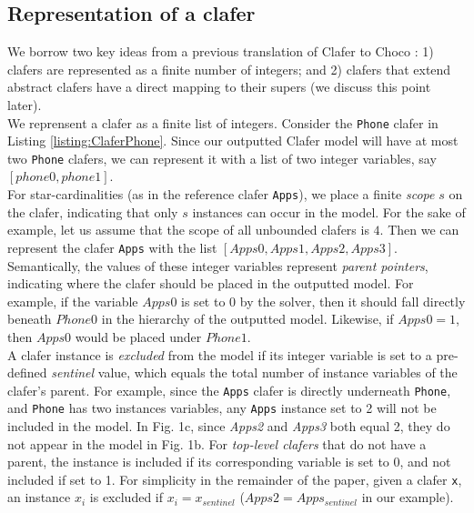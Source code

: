 \documentclass{easychair}
\begin{document}
\subsection{Representation of a clafer}
\label{representation}
We borrow two key ideas from a previous translation of Clafer to Choco \cite{Liang}: 1) clafers are represented as a finite number of integers; and 2) clafers that extend abstract clafers have a direct mapping to their supers (we discuss this point later).\\
\indent We reprensent a clafer as a finite list of integers. Consider the \texttt{Phone} clafer in Listing \ref{listing:ClaferPhone}. Since our outputted Clafer model will have at most two \texttt{Phone} clafers, we can represent it with a list of two integer variables, say $[phone0, phone1]$.  \\
\indent For star-cardinalities (as in the reference clafer \texttt{Apps}), we place a finite \textit{scope} $s$ on the clafer, indicating that only $s$ instances can occur in the model. For the sake of example, let us assume that the scope of all unbounded clafers is $4$. Then we can represent the clafer \texttt{Apps} with the list $[Apps0, Apps1, Apps2, Apps3]$.\\
\indent Semantically, the values of these integer variables represent \textit{parent pointers}, indicating where the clafer should be placed in the outputted model. For example, if the variable $Apps0$ is set to $0$ by the solver, then it should fall directly beneath $Phone0$ in the hierarchy of the outputted model. Likewise, if $Apps0 = 1$, then $Apps0$ would be placed under $Phone1$.\\
\indent A clafer instance is \textit{excluded} from the model if its integer variable is set to a pre-defined \textit{sentinel} value, which equals the total number of instance variables of the clafer's parent. For example, since the \texttt{Apps} clafer is directly underneath \texttt{Phone}, and \texttt{Phone} has two instances variables, any \texttt{Apps} instance set to 2 will not be included in the model. In Fig. 1c, since \textit{Apps2} and \textit{Apps3} both equal 2, they do not appear in the model in Fig. 1b. For \textit{top-level clafers} that do not have a parent, the instance is included if its corresponding variable is set to 0, and not included if set to 1. For simplicity in the remainder of the paper, given a clafer \texttt{x}, an instance \textit{$x_i$} is excluded if  $x_i = x_{sentinel}$ ($Apps2 = Apps_{sentinel}$ in our example). \\
\end{document}
